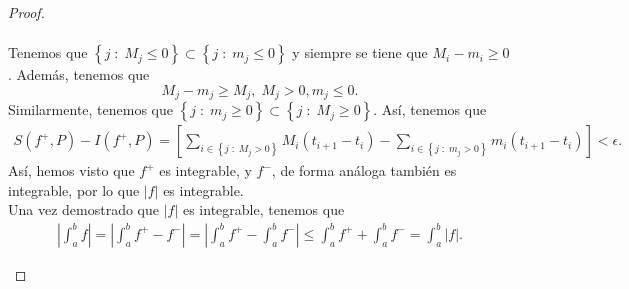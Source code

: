 \begin{proof}
\begin{description}
\[\begin{split}
\end{split}
\]
Tenemos que $\displaystyle \left\{ j \; : \; M_{j} \leq 0\right\} \subset \left\{ j \; : \; m_{j} \leq 0\right\}  $ y siempre se tiene que $\displaystyle M_{i}-m_{i} \geq 0 $. Además, tenemos que 
\[ M_{j}-m_{j} \geq M_{j}, \; M_{j} > 0, m_{j} \leq 0 .\]
Similarmente, tenemos que $\displaystyle \left\{ j \; : \; m_{j} \geq 0\right\} \subset \left\{ j \; : \; M_{j} \geq 0\right\}  $. Así, tenemos que
\[
\begin{split}
	S\left(f^{+},P\right)-I\left(f^{+}, P\right) = \left[\sum^{}_{i \in \left\{ j \; : \; M_{j} > 0\right\}} M_{i}\left(t_{i+1}-t_{i}\right)-\sum^{}_{i \in \left\{ j \; : \; m_{j} > 0\right\} }m_{i}\left(t_{i+1}-t_{i}\right) \right] < \epsilon .
\end{split}
\]
Así, hemos visto que $\displaystyle f^{+} $ es integrable, y $\displaystyle f^{-} $, de forma análoga también es integrable, por lo que $\displaystyle \left|f\right| $ es integrable. \\
	Una vez demostrado que $\displaystyle \left|f\right| $ es integrable, tenemos que 
	\[
	\begin{split}
	\left|\int^{b}_{a} f \right| = \left|\int^{b}_{a} f^{+}-f^{-}\right|= \left|\int^{b}_{a} f^{+} -\int^{b}_{a} f^{-}\right| \leq \int^{b}_{a} f^{+} + \int^{b}_{a} f^{-} = \int^{b}_{a} \left|f\right| .
	\end{split}
	\]
\end{description}
\end{proof}
